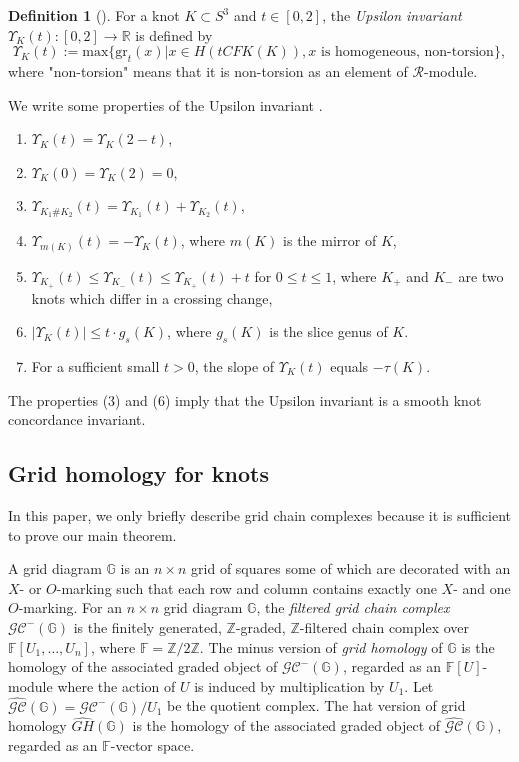 \documentclass[12pt]{amsart}
\theoremstyle{plain}
\theoremstyle{definition}
\newtheorem{dfn}[thm]{Definition}
\theoremstyle{plain}
\theoremstyle{definition}
\newcommand{\R}{\mathbb{R}}
\newcommand{\Z}{\mathbb{Z}}
\newcommand{\G}{\mathbb{G}}
\numberwithin{equation}{section}
\begin{document}
\begin{dfn}[{\cite[Definition 3.6]{Concordance-homomorphisms-from-knot-Floer-homology}}]
For a knot $K\subset S^3$ and $t\in[0,2]$, the \textit{Upsilon invariant} $\Upsilon_K(t)\colon[0,2]\to\R$ is defined by
\[
\Upsilon_K(t):=\mathrm{max}\{\mathrm{gr}_t(x)|x\in H(tCFK(K)),x\textrm{ is homogeneous, non-torsion}\},
\]
where "non-torsion" means that it is non-torsion as an element of $\mathcal{R}$-module.
\end{dfn}

We write some properties of the Upsilon invariant \cite{Concordance-homomorphisms-from-knot-Floer-homology}.

\begin{enumerate}[(1)]
    \item $\Upsilon_K(t)=\Upsilon_K(2-t)$,
    \item $\Upsilon_K(0)=\Upsilon_K(2)=0$,
    \item $\Upsilon_{K_1\#K_2}(t)=\Upsilon_{K_1}(t)+\Upsilon_{K_2}(t)$,
    \item $\Upsilon_{m(K)}(t)=-\Upsilon_K(t)$, where $m(K)$ is the mirror of $K$,
    \item $\Upsilon_{K_+}(t)\leq \Upsilon_{K_-}(t)\leq \Upsilon_{K_+}(t)+t$ for $0\leq t \leq 1$, where $K_+$ and $K_-$ are two knots which differ in a crossing change,
    \item $|\Upsilon_K(t)|\leq t\cdot g_s(K)$, where $g_s(K)$ is the slice genus of $K$.
    \item For a sufficient small $t>0$, the slope of $\Upsilon_K(t)$ equals $-\tau(K)$.
\end{enumerate}
The properties (3) and (6) imply that the Upsilon invariant is a smooth knot concordance invariant.

\subsection{Grid homology for knots}
In this paper, we only briefly describe grid chain complexes because it is sufficient to prove our main theorem.

A grid diagram $\G$ is an $n\times n$ grid of squares some of which are decorated with an $X$- or $O$-marking such that each row and column contains exactly one $X$- and one $O$-marking.
For an $n\times n$ grid diagram $\G$, the \textit{filtered grid chain complex} $\mathcal{GC}^-(\G)$ is the finitely generated, $\Z$-graded, $\Z$-filtered chain complex over $\mathbb{F}[U_1,\dots,U_n]$, where $\mathbb{F}=\mathbb{Z}/2\mathbb{Z}$.
The minus version of \textit{grid homology} of $\G$ is the homology of the associated graded object of $\mathcal{GC}^-(\G)$, regarded as an $\mathbb{F}[U]$-module where the action of $U$ is induced by multiplication by $U_1$.
Let $\widehat{\mathcal{GC}}(\G)=\mathcal{GC}^-(\G)/U_1$ be the quotient complex.
The hat version of grid homology $\widehat{GH}(\G)$ is the homology of the associated graded object of $\widehat{\mathcal{GC}}(\G)$, regarded as an $\mathbb{F}$-vector space.
\end{document}
